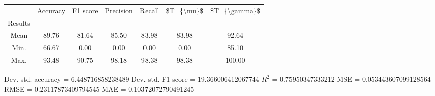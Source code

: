 \begin{tabular}{|c|c|c|c|c|c|c|}
\toprule
{} &  Accuracy &  F1 score &  Precision &  Recall &  \$T\_\{\textbackslash mu\}\$ &  \$T\_\{\textbackslash gamma\}\$ \\
Results &           &           &            &         &            &               \\
\hline
Mean    &     89.76 &     81.64 &      85.50 &   83.98 &      83.98 &         92.64 \\
Min.    &     66.67 &      0.00 &       0.00 &    0.00 &       0.00 &         85.10 \\
Max.    &     93.48 &     90.75 &      98.18 &   98.38 &      98.38 &        100.00 \\
\bottomrule
\end{tabular}

 Dev. std. accuracy = 6.448716858238489
 Dev. std. F1-score = 19.366006412067744
 $R^2$ = 0.75950347333212
 MSE = 0.053443607099128564
 RMSE = 0.23117873409794545
 MAE = 0.10372072790491245